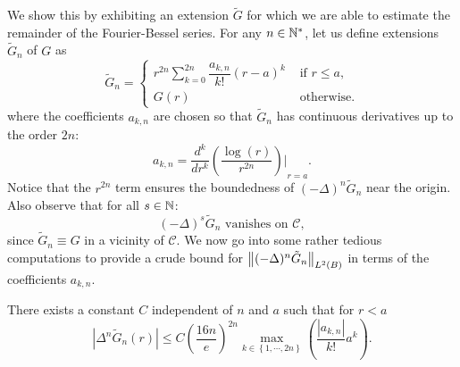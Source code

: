 \documentclass[smallextended]{svjour3}
\begin{document}
We show this by exhibiting an extension $\tilde{G}$ for which we are able to estimate the remainder of the Fourier-Bessel series.
For any $n \in \mathbb{N}^{*}$, let us define extensions $\tilde{G}_n$ of $G$ as
\begin{equation}
	\tilde{G}_n = \begin{cases}
	r^{2n}\sum_{k=0}^{2n} \dfrac{a_{k,n}}{k!}(r-a)^k &\text{ if }r \leq a, \\
	G(r) &\text{ otherwise.}
	\end{cases}
\end{equation}
where the coefficients $a_{k,n}$ are chosen so that $\tilde{G}_n$ has continuous derivatives up to the order $2n$:
\[a_{k,n} = {\dfrac{d^k}{dr^k}\left(\dfrac{\log(r)}{r^{2n}}\right)\bigg|}_{r=a}.\]
Notice that the $r^{2n}$ term ensures the boundedness of $(-\Delta)^n \tilde{G}_n$ near the origin. Also observe that for all $s \in \mathbb{N}$:
\[(-\Delta)^s \tilde{G}_n \text{ vanishes on } \mathcal{C},\]
since $\tilde{G}_n \equiv G$ in a vicinity of $\mathcal{C}$. 
We now go into some rather tedious computations to provide a crude bound for $\left\|(-\Delta)^n \tilde{G}_n\right\|_{L^2(B)}$ in terms of the coefficients $a_{k,n}$.
																		
\begin{lemma} 
	\label{LemmeDegueu}
	There exists a constant $C$ independent of $n$ and $a$ such that for $r<a$
	\begin{equation}
		\left|\Delta^n \tilde{G}_n(r)\right| \leq  C \left( \frac{16n}{e}\right)^{2n}\!\!\!\!\!\max_{k\in \left\{1,\cdots,2n\right\}}\left(\dfrac{|a_{k,n}|}{k!}a^k\right).
		\label{bigBadEq1Reduced}
	\end{equation}
	\label{LemAkDeltanf}
\end{lemma}
																		
\end{document}

